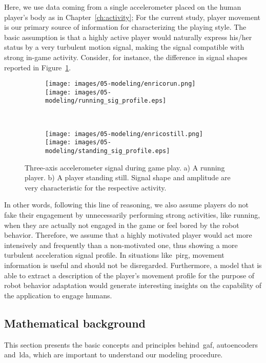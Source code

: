 Here, we use data coming from a single accelerometer placed on the human player's body as in Chapter~\ref{ch:activity}; For the current study, player movement is our primary source of information for characterizing the playing style. The basic assumption is that a highly active player would naturally express his/her status by a very turbulent motion signal, making the signal compatible with strong in-game activity. Consider, for instance, the difference in signal shapes reported in Figure~\ref{figure:acc_signal_shape}.

\begin{figure}[h]
    \centering
    \begin{subfigure}[h]{\textwidth}
        \centering
        \texttt{[image: images/05-modeling/enricorun.png]} 
        \texttt{[image: images/05-modeling/running\_sig\_profile.eps]} 
        \caption{}
    \end{subfigure}\vspace{6pt}
    ~
    \begin{subfigure}[h]{\textwidth}
        \centering
        \texttt{[image: images/05-modeling/enricostill.png]}
        \texttt{[image: images/05-modeling/standing\_sig\_profile.eps]} 
        \caption{}
    \end{subfigure} \vspace{-6pt}
    \caption{Three-axis accelerometer signal during game play. a) A running player. b) A player standing still. Signal shape and amplitude are very characteristic for the respective activity.}
    \label{figure:acc_signal_shape}
\end{figure} \unskip

In other words, following this line of reasoning, we also assume players do not fake their engagement by unnecessarily performing strong activities, like running, when they are actually not engaged in the game or feel bored by the robot behavior. Therefore, we assume that a highly motivated player would act more intensively and frequently than a non-motivated one, thus showing a more turbulent acceleration signal profile. In situations like~\gls{pirg}, movement information is useful and should not be disregarded. Furthermore, a model that is able to extract a description of the player's movement profile for the purpose of robot behavior adaptation would generate interesting insights on the capability of the application to engage humans.

\subsection{Mathematical background}
This section presents the basic concepts and principles behind~\gls{gaf}, autoencoders and~\gls{lda}, which are important to understand our modeling procedure.

